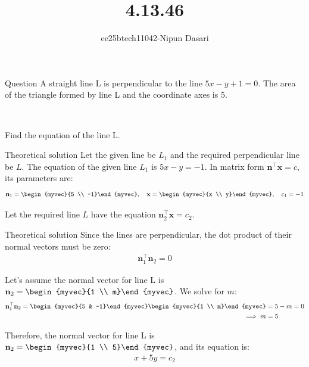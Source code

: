 \documentclass{beamer}
\title{4.13.46}
\author{ee25btech11042-Nipun Dasari}
\numberwithin{equation}{section}
\theoremstyle{remark}
\let\vec\mathbf
\begin{document}
	
	\begin{frame}
		\titlepage
	\end{frame}
	
	\begin{frame}{Question}
		\large
		A straight line L is perpendicular to the line $5x - y + 1 = 0$.
		The area of the triangle formed by line L and the coordinate axes is 5.
		
		\
		
		Find the equation of the line L.
	\end{frame}
	
	\begin{frame}{Theoretical solution}
		Let the given line be $L_1$ and the required perpendicular line be $L$.
		The equation of the given line $L_1$ is $5x - y = -1$.
		In matrix form $\vec{n}^\top\vec{x} = c$, its parameters are:
		\begin{align}
			\vec{n}_1 = \begin{myvec}{5 \\ -1}\end{myvec}, \quad \vec{x} = \begin{myvec}{x \\ y}\end{myvec}, \quad c_1 = -1
		\end{align}
		
		
		Let the required line $L$ have the equation $\vec{n}_2^\top\vec{x} = c_2$.
	\end{frame}
	
	\begin{frame}{Theoretical solution}
		Since the lines are perpendicular, the dot product of their normal vectors must be zero:
		\begin{align} 
			\vec{n}_1^\top\vec{n}_2 = 0 
		\end{align}
		
		
		Let's assume the normal vector for line L is $\vec{n}_2 = \begin{myvec}{1 \\ m}\end{myvec}$.
		We solve for $m$:
		\begin{align}
			\vec{n}_1^\top\vec{n}_2 = \begin{myvec}{5 & -1}\end{myvec}\begin{myvec}{1 \\ m}\end{myvec} &= 5 - m = 0 \\
			\implies m &= 5
		\end{align}
		
		
		Therefore, the normal vector for line L is $\vec{n}_2 = \begin{myvec}{1 \\ 5}\end{myvec}$, and its equation is:
		\begin{align} 
			x + 5y = c_2 
		\end{align}
	\end{frame}
	
\end{document}
